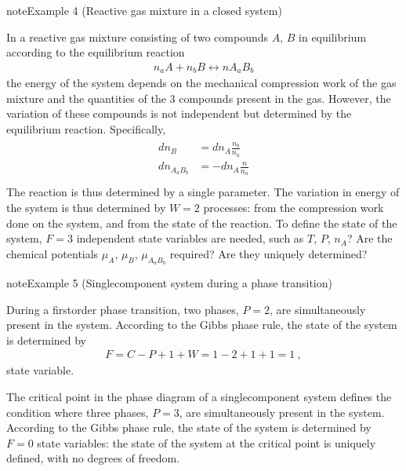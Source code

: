 \documentclass[letterpaper,10pt,english]{jupyterBook}
\begin{document}
\label{ch/principles-gibbs-phase-rule:example-7}
\begin{sphinxadmonition}{note}{Example 4 (Reactive gas mixture in a closed system)}



\sphinxAtStartPar
In a reactive gas mixture consisting of two compounds \(A\), \(B\) in equilibrium according to the equilibrium reaction
\begin{equation*}
\begin{split}n_a A + n_b B \leftrightarrow n A_a B_b\end{split}
\end{equation*}
\sphinxAtStartPar
the energy of the system depends on the mechanical compression work of the gas mixture and the quantities of the 3 compounds present in the gas. However, the variation of these compounds is not independent but determined by the equilibrium reaction. Specifically,
\begin{equation*}
\begin{split}\begin{aligned}
  d n_{B} & = d n_{A} \frac{n_b}{n_a} \\
  d n_{A_a B_b} & = - d n_{A} \frac{n}{n_a} \\
\end{aligned}\end{split}
\end{equation*}
\sphinxAtStartPar
The reaction is thus determined by a single parameter. The variation in energy of the system is thus determined by \(W=2\) processes: from the compression work done on the system, and from the state of the reaction. To define the state of the system, \(F=3\) independent state variables are needed, such as  \(T\), \(P\), \(n_A\)? Are the chemical potentials \(\mu_A\), \(\mu_B\), \(\mu_{A_a B_b}\) required? Are they uniquely determined?
\end{sphinxadmonition}
\label{ch/principles-gibbs-phase-rule:example-8}
\begin{sphinxadmonition}{note}{Example 5 (Single\sphinxhyphen{}component system during a phase transition)}



\sphinxAtStartPar
{} During a first\sphinxhyphen{}order phase transition, two phases, \(P = 2\), are simultaneously present in the system. According to the Gibbs phase rule, the state of the system is determined by
\begin{equation*}
\begin{split}F = C - P + 1 + W = 1 - 2 + 1 + 1 = 1 \ ,\end{split}
\end{equation*}
\sphinxAtStartPar
state variable.

\sphinxAtStartPar
{} The critical point in the phase diagram of a single\sphinxhyphen{}component system defines the condition where three phases, \(P = 3\), are simultaneously present in the system. According to the Gibbs phase rule, the state of the system is determined by \(F = 0\) state variables: the state of the system at the critical point is uniquely defined, with no degrees of freedom.
\end{sphinxadmonition}
\end{document}

